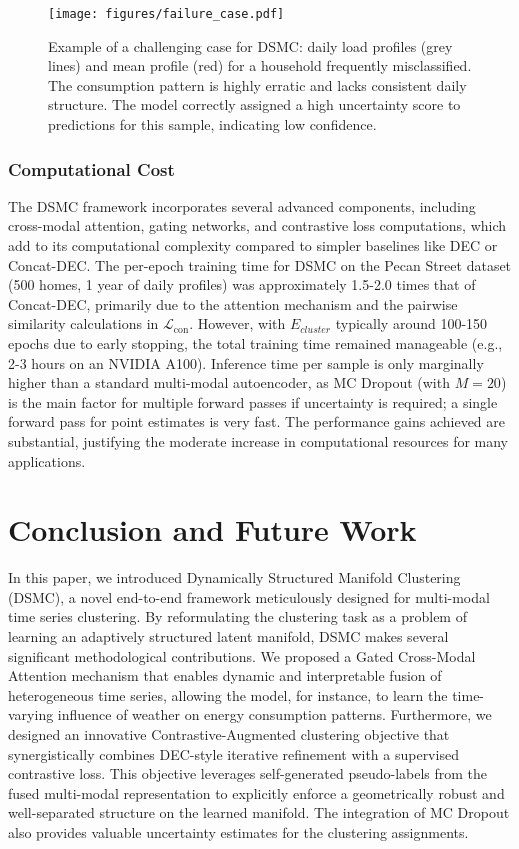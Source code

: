 \documentclass[journal]{IEEEtran}
\begin{document}
\begin{figure}[h!]
\centering
\texttt{[image: figures/failure\_case.pdf]} %
\caption{Example of a challenging case for DSMC: daily load profiles (grey lines) and mean profile (red) for a household frequently misclassified. The consumption pattern is highly erratic and lacks consistent daily structure. The model correctly assigned a high uncertainty score to predictions for this sample, indicating low confidence.}
\label{fig:failure_case}
\end{figure}

\subsubsection{Computational Cost}
The DSMC framework incorporates several advanced components, including cross-modal attention, gating networks, and contrastive loss computations, which add to its computational complexity compared to simpler baselines like DEC or Concat-DEC. The per-epoch training time for DSMC on the Pecan Street dataset (500 homes, 1 year of daily profiles) was approximately 1.5-2.0 times that of Concat-DEC, primarily due to the attention mechanism and the pairwise similarity calculations in $\mathcal{L}_{\text{con}}$. However, with $E_{cluster}$ typically around 100-150 epochs due to early stopping, the total training time remained manageable (e.g., 2-3 hours on an NVIDIA A100). Inference time per sample is only marginally higher than a standard multi-modal autoencoder, as MC Dropout (with $M=20$) is the main factor for multiple forward passes if uncertainty is required; a single forward pass for point estimates is very fast. The performance gains achieved are substantial, justifying the moderate increase in computational resources for many applications.

\section{Conclusion and Future Work}
In this paper, we introduced Dynamically Structured Manifold Clustering (DSMC), a novel end-to-end framework meticulously designed for multi-modal time series clustering. By reformulating the clustering task as a problem of learning an adaptively structured latent manifold, DSMC makes several significant methodological contributions. We proposed a Gated Cross-Modal Attention mechanism that enables dynamic and interpretable fusion of heterogeneous time series, allowing the model, for instance, to learn the time-varying influence of weather on energy consumption patterns. Furthermore, we designed an innovative Contrastive-Augmented clustering objective that synergistically combines DEC-style iterative refinement with a supervised contrastive loss. This objective leverages self-generated pseudo-labels from the fused multi-modal representation to explicitly enforce a geometrically robust and well-separated structure on the learned manifold. The integration of MC Dropout also provides valuable uncertainty estimates for the clustering assignments.
\end{document}

